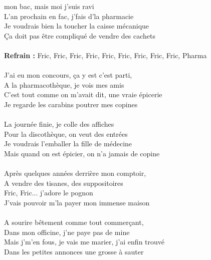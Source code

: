 
 mon bac, mais moi j'suis ravi
\\L'an prochain en fac, j'fais d'la pharmacie
\\Je voudrais bien la toucher la caisse mécanique
\\Ça doit pas être compliqué de vendre des cachets
\\\\\textbf{Refrain :}
{Fric, Fric, Fric, Fric, Fric, Fric, Fric, Fric, Fric, Pharma }
\\\\J'ai eu mon concours, ça y est c'est parti,
\\A la pharmacothèque, je vois mes amis
\\C'est tout comme on m'avait dit, une vraie épicerie
\\Je regarde les carabins poutrer mes copines
\\\\La journée finie, je colle des affiches
\\Pour la discothèque, on veut des entrées
\\Je voudrais l'emballer la fille de médecine
\\Mais quand on est épicier, on n'a jamais de copine
\\\\Après quelques années derrière mon comptoir,
\\A vendre des tisanes, des suppositoires
\\Fric, Fric... j'adore le pognon
\\J'vais pouvoir m'la payer mon immense maison
\\\\A sourire bêtement comme tout commerçant,
\\Dans mon officine, j'ne paye pas de mine
\\Mais j'm'en fous, je vais me marier, j'ai enfin trouvé
\\Dans les petites annonces une grosse à sauter
\breakpage
